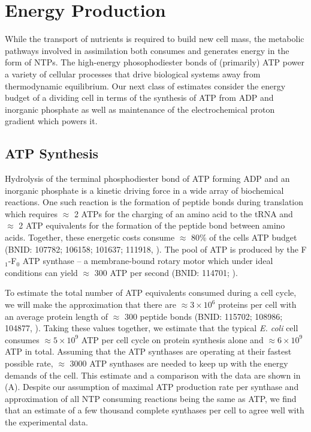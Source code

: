 \section{Energy Production}

While the transport of nutrients is required to build new cell mass, the
metabolic pathways involved in assimilation both consumes and generates energy
in the form of NTPs. The high-energy phosophodiester bonds of (primarily) ATP
power a variety of cellular processes that drive biological systems away
from thermodynamic equilibrium. Our next class of estimates consider the energy budget
of a dividing cell in terms of the synthesis of ATP from ADP and inorganic
phosphate as well as maintenance of the electrochemical proton gradient which powers it.

\subsection{ATP Synthesis}

Hydrolysis of the terminal phosphodiester bond of ATP forming ADP and an
inorganic phosphate is a kinetic driving force in a wide array of biochemical
reactions. One such reaction is the formation of peptide bonds during
translation which requires $\approx$ 2 ATPs for the charging of an amino acid
to the tRNA and $\approx$ 2 ATP equivalents for the formation of the peptide
bond between amino acids. Together, these energetic costs consume $\approx$
80\% of the cells ATP budget (BNID: 107782; 106158; 101637; 111918,
\cite{milo2010}). The pool of ATP is produced by the F$_1$-F$_0$ ATP synthase
-- a membrane-bound rotary motor which under ideal conditions can yield
$\approx$ 300 ATP per second (BNID: 114701; \cite{milo2010, weber2003}).

To estimate the total number of ATP equivalents consumed during a cell cycle, we
will make the approximation that there are $\approx 3\times10^6$ proteins per
cell with an average protein length of $\approx$ 300 peptide bonds (BNID:
115702; 108986; 104877, \cite{milo2010}). Taking these values together, we
estimate that the typical \textit{E. coli} cell consumes $\approx
5 \times 10^9$ ATP per cell cycle on protein synthesis alone and $\approx
6\times 10^9$ ATP in total. Assuming that the ATP synthases are operating at
their fastest possible rate, $\approx$ 3000  ATP synthases are needed to keep up with the energy demands of the cell. This
estimate and a comparison with the data are shown in  (A).
Despite our assumption of maximal ATP production rate per synthase and
approximation of all NTP consuming reactions being the same as ATP, we find that
an estimate of a few thousand complete synthases per cell to agree well with the
experimental data.

